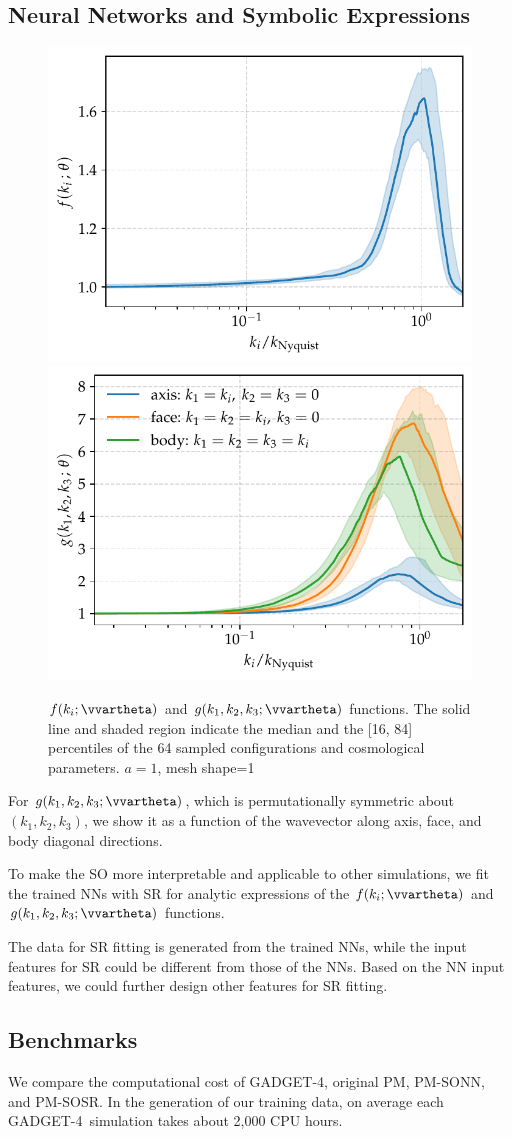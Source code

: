 \documentclass[modern, trackchanges, dvipsnames]{aastex631}
\newcommand{\GADGET}{{{\fontsize{10pt}{12pt}\selectfont GADGET}-4}}
\begin{document}
\subsection{Neural Networks and Symbolic Expressions}

\begin{figure}
  \centering
  \includegraphics[width=.48\columnwidth]{net_f_a1_j3177874_e3000.pdf}
  \includegraphics[width=.48\columnwidth]{net_g_a1_j3177874_e3000.pdf}
  \caption{$f(k_i; \vvartheta)$ and $g(k_1, k_2, k_3; \vvartheta)$
  functions. The solid line and shaded region indicate the median and
  the [16, 84] percentiles of the 64 sampled configurations and
  cosmological parameters. $a=1$,
  mesh shape=1}
  \label{fig:func}
\end{figure}

For $g(k_1,k_2,k_3;\vvartheta)$, which is permutationally symmetric
about $(k_1, k_2, k_3)$, we show it as a function of the wavevector
along axis, face, and body diagonal directions.


To make the SO more interpretable and applicable to other simulations,
we fit the trained NNs with SR for analytic expressions of the $f(k_i;
\vvartheta)$ and $g(k_1, k_2, k_3; \vvartheta)$ functions.

The data for SR fitting is generated from the trained NNs, while the
input features for SR could be different from those of the NNs.
Based on the NN input features, we could further design other features
for SR fitting.


\subsection{Benchmarks}
We compare the computational cost of \GADGET, original PM, PM-SONN, and
PM-SOSR.
In the generation of our training data, on average each \GADGET\
simulation takes about 2,000 CPU hours.
\end{document}
